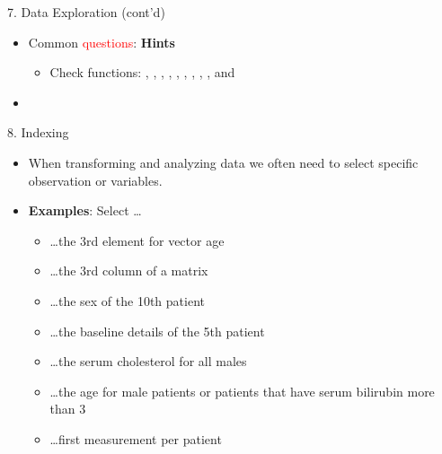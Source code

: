 \documentclass[14pt, aspectratio=169, sectionpage=simple, xclolor=table]{beamer}
\begin{document}
\begin{frame}{7. Data Exploration (cont'd)}
\begin{itemize}
\item Common \textcolor{red}{questions}: \textbf{Hints}
\vspace{1ex}
\begin{itemize}
\item Check functions: , , , , , , , , ,  and 
\end{itemize}
\end{itemize}
\end{frame}

\begin{frame}[lbslide]{}
\begin{itemize}
	\item {}
\end{itemize}

\end{frame}


\begin{frame}{8. Indexing}
\vspace*{-0.5ex}
\begin{itemize}
	\item When transforming and analyzing data we often need to select specific observation or variables. 
	\nl
	\item\textbf{Examples}: Select \ldots
	\begin{itemize}
		\item \ldots the 3rd element for vector age
		\item \ldots the 3rd column of a matrix
		\item \ldots the sex of the 10th patient
        \item \ldots the baseline details of the 5th patient
        \item \ldots the serum cholesterol for all males
        \item \ldots the age for male patients or patients that have serum bilirubin more than 3
        \item \ldots first measurement per patient
	\end{itemize}
\end{itemize}
\end{frame}
\end{document}
